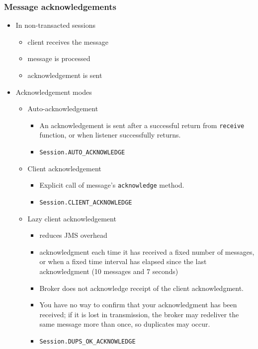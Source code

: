 \documentclass[10pt,xcolor=pdflatex]{beamer}
\begin{document}
\begin{frame}[containsverbatim]\frametitle{Message acknowledgements}
\begin{itemize}
  \item In non-transacted sessions
	\begin{itemize}
	  \item client receives the message
	  \item message is processed
	  \item acknowledgement is sent
	\end{itemize}
  \item Acknowledgement modes
	\begin{itemize}
	  \item Auto-acknowledgement
        \begin{itemize}
          \item An acknowledgement is sent after a successful return from \texttt{receive} function, or when listener successfully returns.
          \item \texttt{Session.AUTO\_ACKNOWLEDGE}
        \end{itemize}
	  \item Client acknowledgement 
        \begin{itemize}
          \item Explicit call of message's \texttt{acknowledge} method.
	      \item \texttt{Session.CLIENT\_ACKNOWLEDGE}
        \end{itemize}
      \item Lazy client acknowledgement 
        \begin{itemize}
          \item reduces JMS overhead
          \item acknowledgment each time it has received a fixed number of messages, or when a fixed time interval has elapsed since the last acknowledgment (10 messages and 7 seconds)
          \item Broker does not acknowledge receipt of the client acknowledgment.
          \item You have no way to confirm that your acknowledgment has been received; if it is lost in transmission, the broker may redeliver the same message more than once, so duplicates may occur.
	      \item \texttt{Session.DUPS\_OK\_ACKNOWLEDGE}
        \end{itemize}
    \end{itemize}
\end{itemize}
\end{frame}
\end{document}

